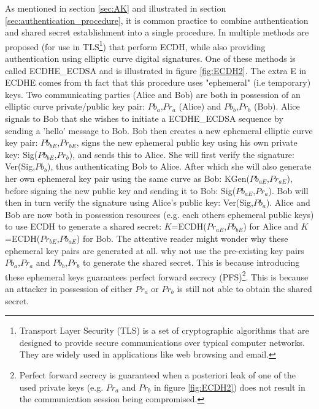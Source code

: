 As mentioned in section \ref{sec:AK} and illustrated in section \ref{sec:authentication_procedure}, it is common practice to combine authentication and shared secret establishment into a single procedure. In \cite{RFC4492} multiple methods are proposed (for use in TLS\footnote{Transport Layer Security (TLS) is a set of cryptographic algorithms that are designed to provide secure communications over typical computer networks. They are widely used in applications like web browsing and email.}) that perform ECDH, while also providing authentication using elliptic curve digital signatures. One of these methods is called ECDHE\_ECDSA and is illustrated in figure \ref{fig:ECDH2}. The extra E in ECDHE comes from th fact that this procedure uses "ephemeral" (i.e temporary) keys. Two communicating parties (Alice and Bob) are both in possession of an elliptic curve private/public key pair: $Pb_a$,$Pr_a$ (Alice) and $Pb_b$,$Pr_b$ (Bob). Alice signals to Bob that she wishes to initiate a ECDHE\_ECDSA sequence by sending a 'hello' message to Bob. Bob then creates a new ephemeral elliptic curve key pair: $Pb_{bE}$,$Pr_{bE}$, signs the new ephemeral public key using his own private key: Sig($Pb_{bE}$,$Pr_b$), and sends this to Alice. She will first verify the signature: Ver(Sig,$Pb_{b}$), thus authenticating Bob to Alice. After which she will also generate her own ephemeral key pair using the same curve as Bob: KGen($Pb_{aE}$,$Pr_{aE}$), before signing the new public key and sending it to Bob: Sig($Pb_{aE}$,$Pr_a$). Bob will then in turn verify the signature using Alice's public key: Ver(Sig,$Pb_{a}$). Alice and Bob are now both in possession resources (e.g. each others ephemeral public keys) to use ECDH to generate a shared secret: $K$=ECDH($Pr_{aE}$,$Pb_{bE}$) for Alice and $K$=ECDH($Pr_{bE}$,$Pb_{aE}$) for Bob. The attentive reader might wonder why these ephemeral key pairs are generated at all. why not use the pre-existing key pairs $Pb_a$,$Pr_a$ and $Pb_b$,$Pr_b$ to generate the shared secret. This is because introducing these ephemeral keys guarantees perfect forward secrecy (PFS)\footnote{Perfect forward secrecy is guaranteed when a posteriori leak of one of the used private keys (e.g. $Pr_a$ and $Pr_b$ in figure \ref{fig:ECDH2}) does not result in the communication session being compromised.}. This is because an attacker in possession of either $Pr_a$ or $Pr_b$ is still not able to obtain the shared secret.



